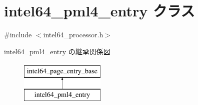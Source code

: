 \hypertarget{classintel64__pml4__entry}{}\section{intel64\+\_\+pml4\+\_\+entry クラス}
\label{classintel64__pml4__entry}


{\ttfamily \#include $<$intel64\+\_\+processor.\+h$>$}

intel64\+\_\+pml4\+\_\+entry の継承関係図\begin{figure}[H]
\begin{center}
\leavevmode
\includegraphics[height=2.000000cm]{classintel64__pml4__entry}
\end{center}
\end{figure}
